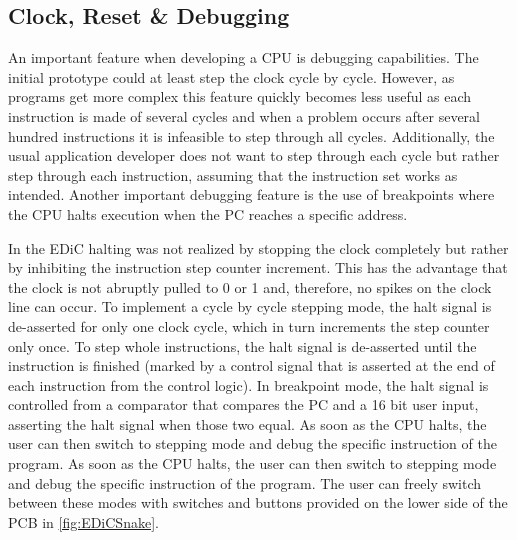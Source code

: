 \subsection{Clock, Reset \& Debugging}\label{sec:clock}
An important feature when developing a \gls{CPU} is debugging capabilities.
The initial prototype could at least step the clock cycle by cycle.
However, as programs get more complex this feature quickly becomes less useful as each instruction is made of several cycles and when a problem occurs after several hundred instructions it is infeasible to step through all cycles.
Additionally, the usual application developer does not want to step through each cycle but rather step through each instruction, assuming that the instruction set works as intended.
Another important debugging feature is the use of breakpoints where the \gls{CPU} halts execution when the \gls{PC} reaches a specific address.

In the \gls{EDiC} halting was not realized by stopping the clock completely but rather by inhibiting the instruction step counter increment.
This has the advantage that the clock is not abruptly pulled to 0 or 1 and, therefore, no spikes on the clock line can occur.
To implement a cycle by cycle stepping mode, the halt signal is de-asserted for only one clock cycle, which in turn increments the step counter only once.
To step whole instructions, the halt signal is de-asserted until the instruction is finished (marked by a control signal that is asserted at the end of each instruction from the control logic).
In breakpoint mode, the halt signal is controlled from a comparator that compares the \gls{PC} and a 16 bit user input, asserting the halt signal when those two equal.
As soon as the \gls{CPU} halts, the user can then switch to stepping mode and debug the specific instruction of the program.
As soon as the \gls{CPU} halts, the user can then switch to stepping mode and debug the specific instruction of the program.
The user can freely switch between these modes with switches and buttons provided on the lower side of the \gls{PCB} in \cref{fig:EDiCSnake}.

